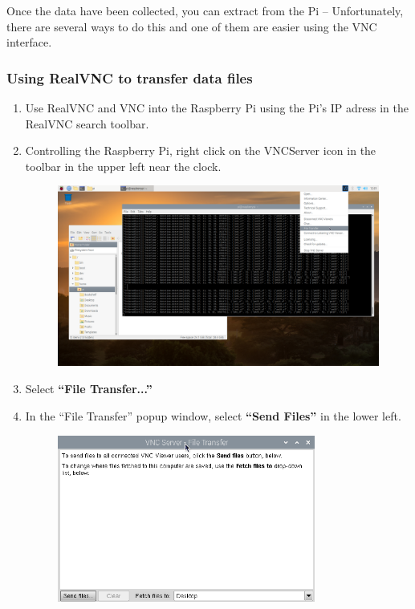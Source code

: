 \documentclass{article}\usepackage[]{graphicx}\usepackage[]{color}
\begin{document}
    Once the data have been collected, you can extract from the Pi -- Unfortunately, there are several ways to do this and one of them are easier using the VNC interface.
    
\subsubsection{Using RealVNC to transfer data files}

\begin{enumerate}

\item Use RealVNC and VNC into the Raspberry Pi using the Pi's IP adress in the RealVNC search toolbar.

\item Controlling the Raspberry Pi, right click on the VNCServer icon in the toolbar in the upper left near the clock.
\begin{figure}[h]
\centering
\includegraphics[width=1\textwidth]{images/4_vncserver_ft}
\caption{}
\label{fig:vncserverfiletransfer}
\end{figure}

\item Select \textbf{``File Transfer...''}

\item In the ``File Transfer'' popup window, select \textbf{``Send Files''} in the lower left.
\begin{figure}[h]
\centering
\includegraphics[width=0.80\textwidth]{images/4_vncserver_ft2}
\caption{}
\label{fig:vncserverfiletransfer2}
\end{figure}


\end{enumerate}
\end{document}
